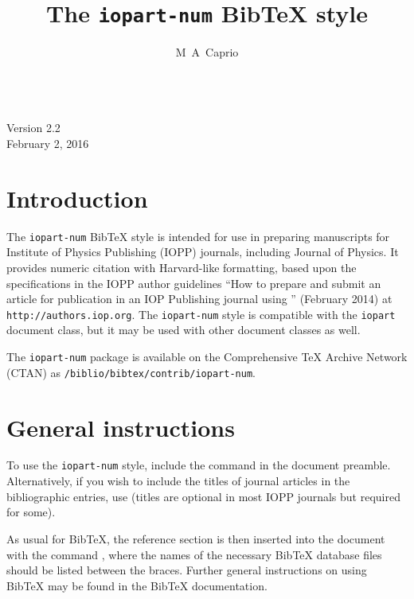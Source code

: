 \documentclass[12pt]{iopart}
\newcommand{\BibTeX}{Bib\TeX}
\begin{document}
\nocite{*}

\title{The \texttt{iopart-num} \BibTeX{} style}

\noindent \qquad \\[-6pt] \qquad Version 2.2\\\qquad February 2, 2016

\author{M~A~Caprio}

\address{Department of Physics, University of Notre Dame,
Notre Dame, Indiana 46556-5670, USA}

\section{Introduction}

The \texttt{iopart-num} \BibTeX{} style is intended for use in
preparing manuscripts for Institute of Physics Publishing (IOPP) journals,
including Journal of Physics.  It provides numeric citation with
Harvard-like formatting, based upon the specifications in the IOPP author guidelines ``How to
prepare and submit an article for publication in an IOP Publishing journal using
\LaTeXe'' (February 2014) at \texttt{http://authors.iop.org}.
The \texttt{iopart-num} style is compatible with the \texttt{iopart}
document class, but it may be used with other document classes as well.

The \texttt{iopart-num} package is available on the Comprehensive
\TeX{} Archive Network (CTAN) as \texttt{/biblio/bibtex/contrib/iopart-num}.

\section{General instructions}

To use the \texttt{iopart-num} style, include the command
\verb++ in the document preamble.
Alternatively, if you wish to include the titles of journal articles
in the bibliographic entries, use
\verb++ (titles are optional in
most IOPP journals but required for some).

As usual for \BibTeX{}, the reference section is then inserted into
the document with the command \verb++, where the
names of the necessary \BibTeX{} database files should be listed
between the braces.  Further general instructions on using \BibTeX{}
may be found in the \BibTeX{} documentation.
\end{document}

